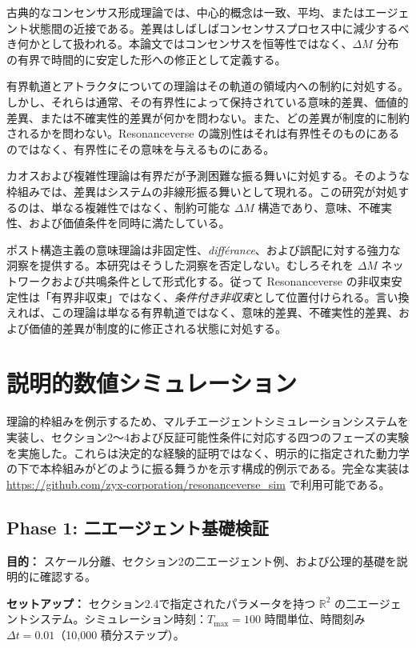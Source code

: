 \documentclass[11pt,a4paper]{article}
\theoremstyle{definition}
\begin{document}
古典的なコンセンサス形成理論では、中心的概念は一致、平均、またはエージェント状態間の近接である。差異はしばしばコンセンサスプロセス中に減少するべき何かとして扱われる。本論文ではコンセンサスを恒等性ではなく、$\Delta M$ 分布の有界で時間的に安定した形への修正として定義する。

有界軌道とアトラクタについての理論はその軌道の領域内への制約に対処する。しかし、それらは通常、その有界性によって保持されている意味的差異、価値的差異、または不確実性的差異が何かを問わない。また、どの差異が制度的に制約されるかを問わない。Resonanceverse の識別性はそれは有界性そのものにあるのではなく、有界性にその意味を与えるものにある。

カオスおよび複雑性理論は有界だが予測困難な振る舞いに対処する。そのような枠組みでは、差異はシステムの非線形振る舞いとして現れる。この研究が対処するのは、単なる複雑性ではなく、制約可能な $\Delta M$ 構造であり、意味、不確実性、および価値条件を同時に満たしている。

ポスト構造主義の意味理論は非固定性、\textit{différance}、および誤配に対する強力な洞察を提供する。本研究はそうした洞察を否定しない。むしろそれを $\Delta M$ ネットワークおよび共鳴条件として形式化する。従って Resonanceverse の非収束安定性は「有界非収束」ではなく、\textit{条件付き非収束}として位置付けられる。言い換えれば、この理論は単なる有界軌道ではなく、意味的差異、不確実性的差異、および価値的差異が制度的に修正される状態に対処する。


\section{説明的数値シミュレーション}

理論的枠組みを例示するため、マルチエージェントシミュレーションシステムを実装し、セクション2～4および反証可能性条件に対応する四つのフェーズの実験を実施した。これらは決定的な経験的証明ではなく、明示的に指定された動力学の下で本枠組みがどのように振る舞うかを示す構成的例示である。完全な実装は \url{https://github.com/zyx-corporation/resonanceverse_sim} で利用可能である。

\subsection{Phase 1: 二エージェント基礎検証}

\textbf{目的：} スケール分離、セクション2の二エージェント例、および公理的基礎を説明的に確認する。

\textbf{セットアップ：} セクション2.4で指定されたパラメータを持つ $\mathbb{R}^2$ の二エージェントシステム。シミュレーション時刻：$T_{\max} = 100$ 時間単位、時間刻み $\Delta t = 0.01$（10,000 積分ステップ）。
\end{document}
